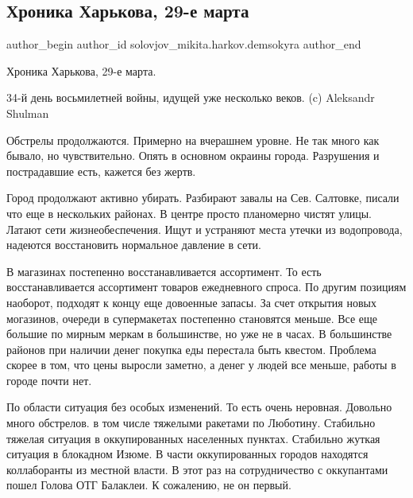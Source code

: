  
 
 
 
 
 
\subsection{Хроника Харькова, 29-е марта}
\label{sec:29_03_2022.fb.solovjov_mikita.harkov.demsokyra.1.hronika}
 
\ifcmt
 author_begin
   author_id solovjov_mikita.harkov.demsokyra
 author_end
\fi

Хроника Харькова, 29-е марта. 

34-й день восьмилетней войны, идущей уже несколько веков. (c) Aleksandr Shulman

Обстрелы продолжаются. Примерно на вчерашнем уровне. Не так много как бывало,
но чувствительно. Опять в основном окраины города. Разрушения и пострадавшие
есть, кажется без жертв. 

Город продолжают активно убирать. Разбирают завалы на Сев. Салтовке, писали что
еще в нескольких районах. В центре просто планомерно чистят улицы. Латают сети
жизнеобеспечения. Ищут и устраняют места утечки из водопровода, надеются
восстановить нормальное давление в сети. 


В магазинах постепенно восстанавливается ассортимент. То есть восстанавливается
ассортимент товаров ежедневного спроса. По другим позициям наоборот, подходят к
концу еще довоенные запасы. За счет открытия новых могазинов, очереди в
супермакетах постепенно становятся меньше. Все еще большие по мирным меркам в
большинстве, но уже не в часах. В большинстве районов при наличии денег покупка
еды перестала быть квестом. Проблема скорее в том, что цены выросли заметно, а
денег у людей все меньше, работы в городе почти нет. 

По области ситуация без особых изменений. То есть очень неровная. Довольно
много обстрелов. в том числе тяжелыми ракетами по Люботину. Стабильно тяжелая
ситуация в оккупированных населенных пунктах. Стабильно жуткая ситуация в
блокадном Изюме. В части оккупированных городов находятся коллаборанты из
местной власти. В этот раз на сотрудничество с оккупантами пошел Голова ОТГ
Балаклеи. К сожалению, не он первый. 

